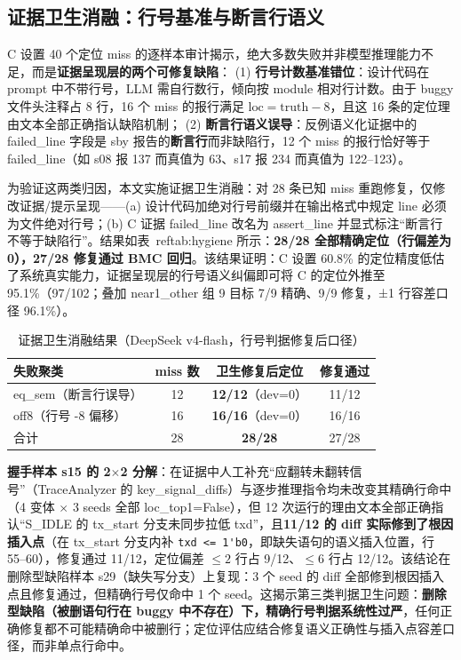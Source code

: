 
\subsection{证据卫生消融：行号基准与断言行语义}\label{sec:evidence-hygiene}
\newcommand{\hyth}{证据卫生（行号标注 + 断言行语义纠偏）}

C 设置 40 个定位 miss 的逐样本审计揭示，绝大多数失败并非模型推理能力不足，而是\textbf{证据呈现层的两个可修复缺陷}：
(1) \textbf{行号计数基准错位}：设计代码在 prompt 中不带行号，LLM 需自行数行，倾向按 module 相对行计数。由于 buggy 文件头注释占 8 行，16 个 miss 的报行满足 $\mathrm{loc} = \mathrm{truth} - 8$，且这 16 条的定位理由文本全部正确指认缺陷机制；
(2) \textbf{断言行语义误导}：反例语义化证据中的 failed\_line 字段是 sby 报告的\textbf{断言行}而非缺陷行，12 个 miss 的报行恰好等于 failed\_line（如 s08 报 137 而真值为 63、s17 报 234 而真值为 122--123）。

为验证这两类归因，本文实施证据卫生消融：对 28 条已知 miss 重跑修复，仅修改证据/提示呈现——(a) 设计代码加绝对行号前缀并在输出格式中规定 line 必须为文件绝对行号；(b) C 证据 failed\_line 改名为 assert\_line 并显式标注\textquotedblleft 断言行不等于缺陷行\textquotedblright。结果如表~ref{tab:hygiene} 所示：\textbf{28/28 全部精确定位（行偏差为 0），27/28 修复通过 BMC 回归}。该结果证明：C 设置 60.8\% 的定位精度低估了系统真实能力，证据呈现层的行号语义纠偏即可将 C 的定位外推至 95.1\%（97/102；叠加 near1\_other 组 9 目标 7/9 精确、9/9 修复，±1 行容差口径 96.1\%）。

\begin{table}[t]
\centering
\caption{证据卫生消融结果（DeepSeek v4-flash，行号判据修复后口径）}
\label{tab:hygiene}
\begin{tabular}{lccc}
\toprule
失败聚类 & miss 数 & 卫生修复后定位 & 修复通过 \\
\midrule
eq\_sem（断言行误导） & 12 & \textbf{12/12}（dev=0） & 11/12 \\
off8（行号 -8 偏移） & 16 & \textbf{16/16}（dev=0） & 16/16 \\
\midrule
合计 & 28 & \textbf{28/28} & 27/28 \\
\bottomrule
\end{tabular}
\end{table}

\textbf{握手样本 s15 的 2$\times$2 分解}：在证据中人工补充\textquotedblleft 应翻转未翻转信号\textquotedblright（TraceAnalyzer 的 key\_signal\_diffs）与逐步推理指令均未改变其精确行命中（4 变体 $\times$ 3 seeds 全部 loc\_top1=False），但 12 次运行的理由文本全部正确指认\textquotedblleft S\_IDLE 的 tx\_start 分支未同步拉低 txd\textquotedblright，且\textbf{11/12 的 diff 实际修到了根因插入点}（在 tx\_start 分支内补 \verb|txd <= 1'b0|，即缺失语句的语义插入位置，行 55--60），修复通过 11/12，定位偏差 $\le 2$ 行占 9/12、$\le 6$ 行占 12/12。该结论在删除型缺陷样本 s29（缺失写分支）上复现：3 个 seed 的 diff 全部修到根因插入点且修复通过，但精确行号仅命中 1 个 seed。这揭示第三类判据卫生问题：\textbf{删除型缺陷（被删语句行在 buggy 中不存在）下，精确行号判据系统性过严}，任何正确修复都不可能精确命中被删行；定位评估应结合修复语义正确性与插入点容差口径，而非单点行命中。

